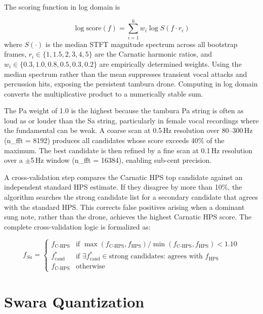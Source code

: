 \documentclass[12pt,a4paper]{report}
\numberwithin{equation}{chapter}
\begin{document}
The scoring function in log domain is

\begin{equation}
\log \text{score}(f) = \sum_{i=1}^{6} w_i \log S(f \cdot r_i)
\label{eq:hps}
\end{equation}
where $S(\cdot)$ is the median STFT magnitude spectrum across all bootstrap frames, $r_i \in \{1, 1.5, 2, 3, 4, 5\}$ are the Carnatic harmonic ratios, and $w_i \in \{0.3, 1.0, 0.8, 0.5, 0.3, 0.2\}$ are empirically determined weights. Using the median spectrum rather than the mean suppresses transient vocal attacks and percussion hits, exposing the persistent tambura drone. Computing in log domain converts the multiplicative product to a numerically stable sum.

The Pa weight of 1.0 is the highest because the tambura Pa string is often as loud as or louder than the Sa string, particularly in female vocal recordings where the fundamental can be weak. A coarse scan at 0.5\,Hz resolution over 80--300\,Hz (n\_fft = 8192) produces all candidates whose score exceeds 40\% of the maximum. The best candidate is then refined by a fine scan at 0.1\,Hz resolution over a $\pm$5\,Hz window (n\_fft = 16384), enabling sub-cent precision.

A cross-validation step compares the Carnatic HPS top candidate against an independent standard HPS estimate. If they disagree by more than 10\%, the algorithm searches the strong candidate list for a secondary candidate that agrees with the standard HPS. This corrects false positives arising when a dominant sung note, rather than the drone, achieves the highest Carnatic HPS score. The complete cross-validation logic is formalized as:

\begin{equation}
f_{Sa} = \begin{cases}
f_{\text{C-HPS}} & \text{if } \max(f_{\text{C-HPS}}, f_{\text{HPS}}) / \min(f_{\text{C-HPS}}, f_{\text{HPS}}) < 1.10 \\
f_{\text{cand}}^* & \text{if } \exists f_{\text{cand}}^* \in \text{strong candidates: agrees with } f_{\text{HPS}} \\
f_{\text{C-HPS}} & \text{otherwise}
\end{cases}
\label{eq:crossval}
\end{equation}

\section{Swara Quantization}
\end{document}

